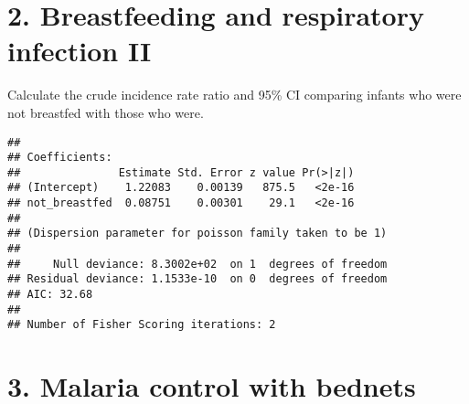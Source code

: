 \documentclass[10pt,handout]{beamer}\usepackage[]{graphicx}\usepackage[]{color}
\makeatletter
\newenvironment{kframe}{%
 \def\at@end@of@kframe{}%
 \ifinner\ifhmode%
  \def\at@end@of@kframe{\end{minipage}}%
  \begin{minipage}{\columnwidth}%
 \fi\fi%
 \def\FrameCommand##1{\hskip\@totalleftmargin \hskip-\fboxsep
 \colorbox{shadecolor}{##1}\hskip-\fboxsep
     \hskip-\linewidth \hskip-\@totalleftmargin \hskip\columnwidth}%
 \MakeFramed {\advance\hsize-\width
   \@totalleftmargin\z@ \linewidth\hsize
   \@setminipage}}%
 {\par\unskip\endMakeFramed%
 \at@end@of@kframe}
\newenvironment{knitrout}{}{} %
\makeatother
\begin{document}
\section{2. Breastfeeding and respiratory infection II}
\begin{frame}
	\vspace*{-1.291in}
	\tiny
Calculate the crude incidence rate ratio and 95\% CI comparing infants who were not breastfed with those who were.
\begin{knitrout}\tiny
{}\color{fgcolor}\begin{kframe}
\begin{verbatim}
## 
## Coefficients:
##               Estimate Std. Error z value Pr(>|z|)
## (Intercept)    1.22083    0.00139   875.5   <2e-16
## not_breastfed  0.08751    0.00301    29.1   <2e-16
## 
## (Dispersion parameter for poisson family taken to be 1)
## 
##     Null deviance: 8.3002e+02  on 1  degrees of freedom
## Residual deviance: 1.1533e-10  on 0  degrees of freedom
## AIC: 32.68
## 
## Number of Fisher Scoring iterations: 2
\end{verbatim}
\end{kframe}
\end{knitrout}
	
\end{frame}





\section{3. Malaria control with bednets}
\end{document}
